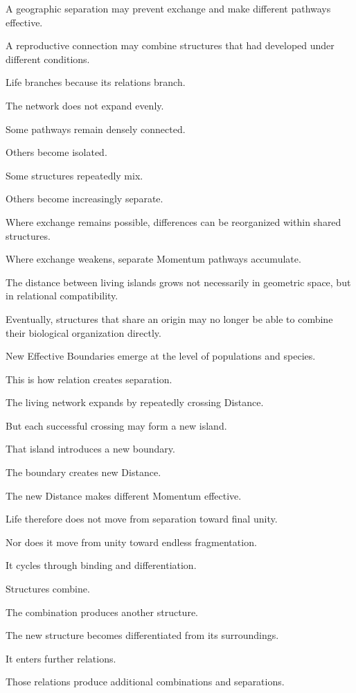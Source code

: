 A geographic separation may prevent exchange and make different pathways effective.

A reproductive connection may combine structures that had developed under different conditions.

Life branches because its relations branch.

The network does not expand evenly.

Some pathways remain densely connected.

Others become isolated.

Some structures repeatedly mix.

Others become increasingly separate.

Where exchange remains possible, differences can be reorganized within shared structures.

Where exchange weakens, separate Momentum pathways accumulate.

The distance between living islands grows not necessarily in geometric space, but in relational compatibility.

Eventually, structures that share an origin may no longer be able to combine their biological organization directly.

New Effective Boundaries emerge at the level of populations and species.

This is how relation creates separation.

The living network expands by repeatedly crossing Distance.

But each successful crossing may form a new island.

That island introduces a new boundary.

The boundary creates new Distance.

The new Distance makes different Momentum effective.

Life therefore does not move from separation toward final unity.

Nor does it move from unity toward endless fragmentation.

It cycles through binding and differentiation.

Structures combine.

The combination produces another structure.

The new structure becomes differentiated from its surroundings.

It enters further relations.

Those relations produce additional combinations and separations.

